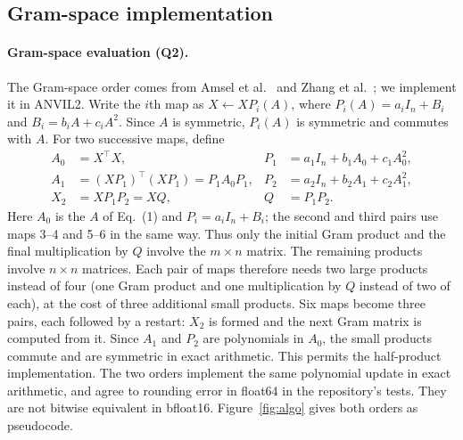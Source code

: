 \documentclass{article}
\begin{document}
\subsection{Gram-space implementation}
\paragraph{Gram-space evaluation (Q2).} The Gram-space order comes from Amsel et al.~\cite{polar} and Zhang et al.~\cite{gramns}; we implement it in ANVIL2. Write the $i$th map as $X\leftarrow XP_i(A)$, where $P_i(A)=a_iI_n+B_i$ and $B_i=b_iA+c_iA^2$. Since $A$ is symmetric, $P_i(A)$ is symmetric and commutes with $A$. For two successive maps, define
\begin{align}
 A_0 &= X^\top X, & P_1 &= a_1I_n+b_1A_0+c_1A_0^2,\\
 A_1 &= (XP_1)^\top(XP_1)=P_1A_0P_1, & P_2 &= a_2I_n+b_2A_1+c_2A_1^2,\\
 X_2 &= XP_1P_2=XQ, & Q &= P_1P_2.
\end{align}
Here $A_0$ is the $A$ of Eq.~(1) and $P_i=a_iI_n+B_i$; the second and third pairs use maps 3--4 and 5--6 in the same way. Thus only the initial Gram product and the final multiplication by $Q$ involve the $m\times n$ matrix. The remaining products involve $n\times n$ matrices. Each pair of maps therefore needs two large products instead of four (one Gram product and one multiplication by $Q$ instead of two of each), at the cost of three additional small products. Six maps become three pairs, each followed by a restart: $X_2$ is formed and the next Gram matrix is computed from it. Since $A_1$ and $P_2$ are polynomials in $A_0$, the small products commute and are symmetric in exact arithmetic. This permits the half-product implementation. The two orders implement the same polynomial update in exact arithmetic, and agree to rounding error in float64 in the repository's tests. They are not bitwise equivalent in bfloat16. Figure~\ref{fig:algo} gives both orders as pseudocode.
\end{document}
